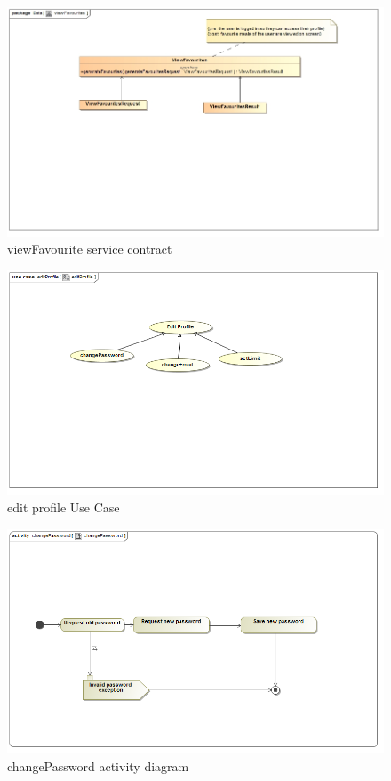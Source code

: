 \documentclass[a4paper,12pt]{article}
\begin{document}
\begin{figure}[H]
	\centering
	\includegraphics[width=1.0\textwidth]{images/viewFavouritesSC.jpg}
	\caption{viewFavourite service contract}
\end{figure}

\begin{figure}[H]
  \centering
    \includegraphics[width=1.0\textwidth]{images/editProfile.png}
    \caption{edit profile Use Case} 
\end{figure}

\begin{figure}[H]
  \centering
    \includegraphics[width=1.0\textwidth]{images/changePassword.png}
    \caption{changePassword activity diagram} 
\end{figure}
	
\end{document}
